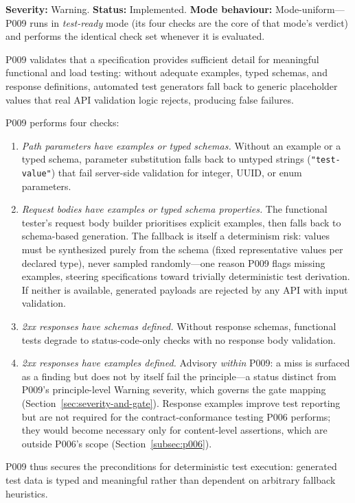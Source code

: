\textbf{Severity:} Warning. \textbf{Status:} Implemented. \textbf{Mode behaviour:} Mode-uniform---P009 runs in \textit{test-ready} mode (its four checks are the core of that mode's verdict) and performs the identical check set whenever it is evaluated.

P009 validates that a specification provides sufficient detail for meaningful functional and load testing: without adequate examples, typed schemas, and response definitions, automated test generators fall back to generic placeholder values that real API validation logic rejects, producing false failures.

P009 performs four checks:
\begin{enumerate}
  \item \textit{Path parameters have examples or typed schemas.} Without an example or a typed schema, parameter substitution falls back to untyped strings (\texttt{"test-value"}) that fail server-side validation for integer, UUID, or enum parameters.
  \item \textit{Request bodies have examples or typed schema properties.} The functional tester's request body builder prioritises explicit examples, then falls back to schema-based generation. The fallback is itself a determinism risk: values must be synthesized purely from the schema (fixed representative values per declared type), never sampled randomly---one reason P009 flags missing examples, steering specifications toward trivially deterministic test derivation. If neither is available, generated payloads are rejected by any API with input validation.
  \item \textit{2xx responses have schemas defined.} Without response schemas, functional tests degrade to status-code-only checks with no response body validation.
  \item \textit{2xx responses have examples defined.} Advisory \emph{within} P009: a miss is surfaced as a finding but does not by itself fail the principle---a status distinct from P009's principle-level Warning severity, which governs the gate mapping (Section~\ref{sec:severity-and-gate}). Response examples improve test reporting but are not required for the contract-conformance testing P006 performs; they would become necessary only for content-level assertions, which are outside P006's scope (Section~\ref{subsec:p006}).
\end{enumerate}

P009 thus secures the preconditions for deterministic test execution: generated test data is typed and meaningful rather than dependent on arbitrary fallback heuristics.

